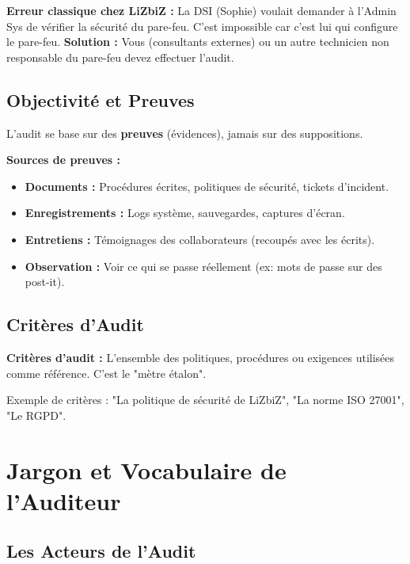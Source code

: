 \begin{boxlizbiz}
\textbf{Erreur classique chez LiZbiZ :}
La DSI (Sophie) voulait demander à l'Admin Sys de vérifier la sécurité du pare-feu. C'est impossible car c'est lui qui configure le pare-feu.
\textbf{Solution :} Vous (consultants externes) ou un autre technicien non responsable du pare-feu devez effectuer l'audit.
\end{boxlizbiz}

\subsection{Objectivité et Preuves}

L'audit se base sur des \textbf{preuves} (évidences), jamais sur des suppositions.

\textbf{Sources de preuves :}
\begin{itemize}
    \item \textbf{Documents :} Procédures écrites, politiques de sécurité, tickets d'incident.
    \item \textbf{Enregistrements :} Logs système, sauvegardes, captures d'écran.
    \item \textbf{Entretiens :} Témoignages des collaborateurs (recoupés avec les écrits).
    \item \textbf{Observation :} Voir ce qui se passe réellement (ex: mots de passe sur des post-it).
\end{itemize}

\subsection{Critères d'Audit}

\begin{boxdef}
\textbf{Critères d'audit :} L'ensemble des politiques, procédures ou exigences utilisées comme référence. C'est le "mètre étalon".
\end{boxdef}

Exemple de critères : "La politique de sécurité de LiZbiZ", "La norme ISO 27001", "Le RGPD".

\section{Jargon et Vocabulaire de l'Auditeur}

\subsection{Les Acteurs de l'Audit}

